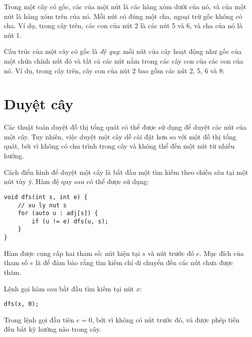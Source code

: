 Trong một cây có gốc, các  của một nút
là các hàng xóm dưới của nó, và  của một nút
là hàng xóm trên của nó.
Mỗi nút có đúng một cha,
ngoại trừ gốc không có cha.
Ví dụ, trong cây trên,
các con của nút 2 là các nút 5 và 6,
và cha của nó là nút 1.


Cấu trúc của một cây có gốc là \emph{đệ quy}:
mỗi nút của cây hoạt động như gốc của một 
chứa chính nút đó và tất cả các nút
nằm trong các cây con của các con của nó.
Ví dụ, trong cây trên, cây con của nút 2
bao gồm các nút 2, 5, 6 và 8:
\begin{center}
\end{center}

\section{Duyệt cây}

Các thuật toán duyệt đồ thị tổng quát
có thể được sử dụng để duyệt các nút của một cây.
Tuy nhiên, việc duyệt một cây dễ cài đặt hơn
so với một đồ thị tổng quát, bởi vì
không có chu trình trong cây và không thể
đến một nút từ nhiều hướng.

Cách điển hình để duyệt một cây là bắt đầu
một tìm kiếm theo chiều sâu tại một nút tùy ý.
Hàm đệ quy sau có thể được sử dụng:

\begin{lstlisting}
void dfs(int s, int e) {
    // xu ly nut s
    for (auto u : adj[s]) {
        if (u != e) dfs(u, s);
    }
}
\end{lstlisting}

Hàm được cung cấp hai tham số: nút hiện tại $s$
và nút trước đó $e$.
Mục đích của tham số $e$ là để đảm bảo
rằng tìm kiếm chỉ di chuyển đến các nút
chưa được thăm.

Lệnh gọi hàm sau bắt đầu tìm kiếm
tại nút $x$:

\begin{lstlisting}
dfs(x, 0);
\end{lstlisting}

Trong lệnh gọi đầu tiên $e=0$, bởi vì không có
nút trước đó, và được phép
tiến đến bất kỳ hướng nào trong cây.

